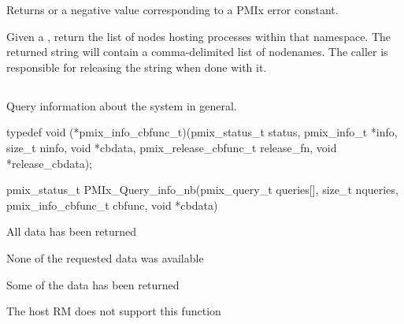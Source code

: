 \begin{arglist}
\end{arglist}

Returns  or a negative value corresponding to a PMIx error constant.

\descr

Given a , return the list of nodes hosting processes within that namespace.
The returned string will contain a comma-delimited list of nodenames.
The caller is responsible for releasing the string when done with it.


\subsection{}

\summary

Query information about the system in general.

\format

\cspecificstart
\begin{codepar}
typedef void (*pmix_info_cbfunc_t)(pmix_status_t status,
                                   pmix_info_t *info, size_t ninfo,
                                   void *cbdata,
                                   pmix_release_cbfunc_t release_fn,
                                   void *release_cbdata);

pmix_status_t
PMIx_Query_info_nb(pmix_query_t queries[], size_t nqueries,
                   pmix_info_cbfunc_t cbfunc, void *cbdata)
\end{codepar}
\cspecificend

\begin{arglist}
\end{arglist}

\begin{constantdesc}
\item {} All data has been returned
\item {} None of the requested data was available
\item {} Some of the data has been returned
\item {} The host \ac{RM} does not support this function
\end{constantdesc}


